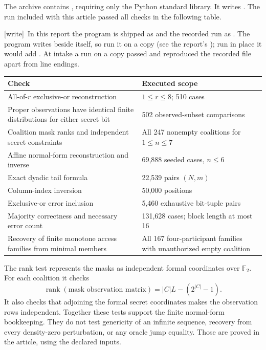 \documentclass[11pt,letterpaper]{article}
\theoremstyle{plain}
\theoremstyle{definition}
\theoremstyle{remark}
\numberwithin{equation}{section}
\DeclareMathOperator{\rk}{rank}
\newcommand{\wtag}{\textup{[write]}}
\begin{document}
The archive contains , requiring only the
Python standard library. It writes . The run
included with this article passed all checks in the following table.

\noindent\wtag\ In this report the program is shipped as
 and the recorded run as
. The program writes  beside
itself, so run it on a copy (see the report's ); run in
place it would add . At intake a run on a copy
passed and reproduced the recorded file apart from line endings.

\begin{center}\small
\begin{tabularx}{\textwidth}{@{}Xp{}@{}}
\toprule
Check & Executed scope\\
\midrule
All-of-$r$ exclusive-or reconstruction & $1\leq r\leq8$; 510 cases\\
Proper observations have identical finite distributions for either secret bit & 502 observed-subset comparisons\\
Coalition mask ranks and independent secret constraints & All 247 nonempty coalitions for $1\leq n\leq7$\\
Affine normal-form reconstruction and inverse & 69,888 seeded cases, $n\leq6$\\
Exact dyadic tail formula & 22,539 pairs $(N,m)$\\
Column-index inversion & 50,000 positions\\
Exclusive-or error inclusion & 5,460 exhaustive bit-tuple pairs\\
Majority correctness and necessary error count & 131,628 cases; block length at most 16\\
Recovery of finite monotone access families from minimal members & All 167 four-participant families with unauthorized empty coalition\\
\bottomrule
\end{tabularx}
\end{center}

The rank test represents the masks as independent formal coordinates over
$\mathbb F_2$. For each coalition it checks
\[
 \rk(\text{mask observation matrix})=|C|L-(2^{|C|}-1).
\]
It also checks that adjoining the formal secret coordinates makes the
observation rows independent. Together these tests support the finite
normal-form bookkeeping. They do not test genericity of an infinite
sequence, recovery from every density-zero perturbation, or any oracle
jump equality. Those are proved in the article, using the declared inputs.
\end{document}

